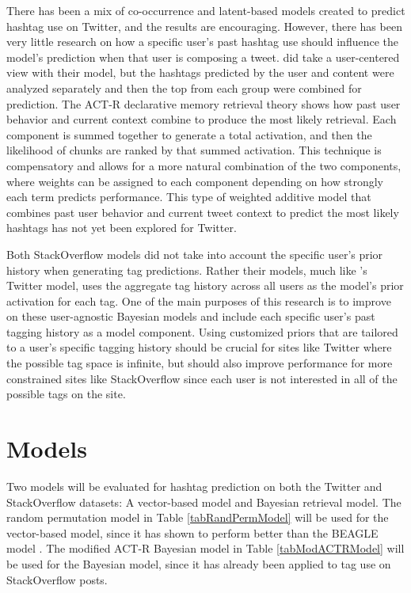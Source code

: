 \documentclass[man,floatsintext,donotrepeattitle]{apa6}
\begin{document}
There has been a mix of co-occurrence and latent-based models created to predict hashtag use on Twitter, and the results are encouraging.
However, there has been very little research on how a specific user's past hashtag use should influence the model's prediction when that user is composing a tweet.
\textcite{Kywe2012} did take a user-centered view with their model, but the hashtags predicted by the user and content were analyzed separately and then the top from each group were combined for prediction.
The ACT-R declarative memory retrieval theory shows how past user behavior and current context combine to produce the most likely retrieval.
Each component is summed together to generate a total activation, and then the likelihood of chunks are ranked by that summed activation.
This technique is compensatory and allows for a more natural combination of the two components, where weights can be assigned to each component depending on how strongly each term predicts performance.
This type of weighted additive model that combines past user behavior and current tweet context to predict the most likely hashtags has not yet been explored for Twitter.

Both StackOverflow models \parencites{Stanley2013,Kuo2011} did not take into account the specific user's prior history when generating tag predictions.
Rather their models, much like \textcite{Mazzia2009}'s Twitter model, uses the aggregate tag history across all users as the model's prior activation for each tag.
One of the main purposes of this research is to improve on these user-agnostic Bayesian models and include each specific user's past tagging history as a model component.
Using customized priors that are tailored to a user's specific tagging history should be crucial for sites like Twitter where the possible tag space is infinite,
but should also improve performance for more constrained sites like StackOverflow since each user is not interested in all of the possible tags on the site. 

\section{Models}

Two models will be evaluated for hashtag prediction on both the Twitter and StackOverflow datasets:
A vector-based model and Bayesian retrieval model.
The random permutation model \parencite{Sahlgren2008} in Table \ref{tabRandPermModel} will be used for the vector-based model, since it has shown to perform better than the BEAGLE model \parencite{Recchia2010}.
The modified ACT-R Bayesian model \parencite{Stanley2013} in Table \ref{tabModACTRModel} will be used for the Bayesian model, since it has already been applied to tag use on StackOverflow posts.
\end{document}
